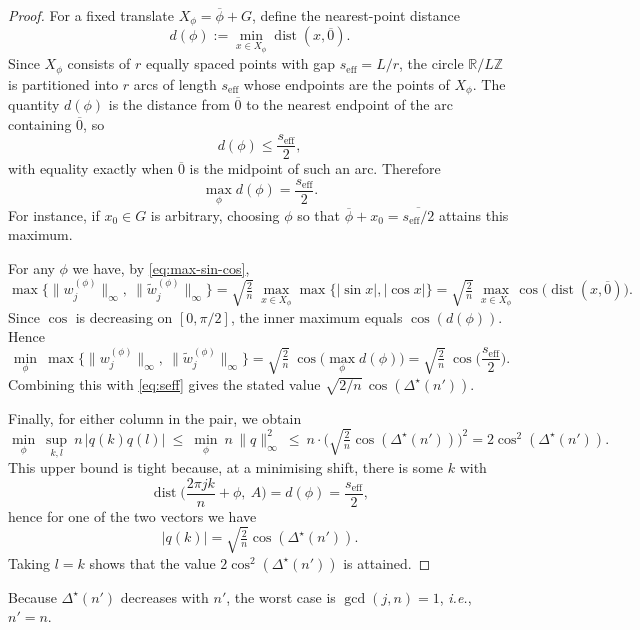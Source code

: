 \documentclass[12pt,fleqn]{amsart}
\renewcommand{\le}{\leqslant}
\theoremstyle{remark}
\newcommand{\1}{\mathbf{1}}
\begin{document}
\begin{proof}
For a fixed translate $X_\phi=\overline{\phi}+G$, define the nearest-point distance
\[
d(\phi):=\min_{x\in X_\phi}\operatorname{dist}(x,\overline{0}).
\]
Since $X_\phi$ consists of $r$ equally spaced points with gap $s_{\mathrm{eff}}=L/r$, the circle $\mathbb R/L\mathbb Z$ is partitioned into $r$ arcs of length $s_{\mathrm{eff}}$ whose endpoints are the points of $X_\phi$. The quantity $d(\phi)$ is the distance from $\overline{0}$ to the nearest endpoint of the arc containing $\overline{0}$, so
\[
d(\phi)\le \frac{s_{\mathrm{eff}}}{2},
\]
with equality exactly when $\overline{0}$ is the midpoint of such an arc. Therefore
\[
\max_{\phi} d(\phi)=\frac{s_{\mathrm{eff}}}{2}.
\]
For instance, if $x_0\in G$ is arbitrary, choosing $\phi$ so that $\overline{\phi}+x_0=\overline{s_{\mathrm{eff}}/2}$ attains this maximum.

\smallskip

For any $\phi$ we have, by \eqref{eq:max-sin-cos},
\[
\max\Big\{\|w^{(\phi)}_j\|_\infty,\ \|\tilde w^{(\phi)}_j\|_\infty\Big\}
=\sqrt{\tfrac{2}{n}}\ \max_{x\in X_\phi}\max\{|\sin x|,|\cos x|\}
=\sqrt{\tfrac{2}{n}}\ \max_{x\in X_\phi}\cos\big(\operatorname{dist}(x,\overline{0})\big).
\]
Since $\cos$ is decreasing on $[0,\pi/2]$, the inner maximum equals $\cos(d(\phi))$. Hence
\[
\min_{\phi}\ \max\Big\{\|w^{(\phi)}_j\|_\infty,\ \|\tilde w^{(\phi)}_j\|_\infty\Big\}
=\sqrt{\tfrac{2}{n}}\ \cos\!\Big(\max_{\phi} d(\phi)\Big)
=\sqrt{\tfrac{2}{n}}\ \cos\!\Big(\frac{s_{\mathrm{eff}}}{2}\Big).
\]
Combining this with \eqref{eq:seff} gives the stated value $\sqrt{2/n}\,\cos(\Delta^\star(n'))$.

Finally, for either column in the pair, we obtain
\[
\min_{\phi}\ \sup_{k,l}\ n\,|q(k)q(l)|
\ \le\ \min_{\phi}\ n\,\|q\|_\infty^2
\ \le\ n\cdot \Big(\sqrt{\tfrac{2}{n}}\cos(\Delta^\star(n'))\Big)^2
=2\cos^2(\Delta^\star(n')).
\]
This upper bound is tight because, at a minimising shift, there is some $k$ with
\[
\operatorname{dist}\!\Big(\frac{2\pi jk}{n}+\phi,\ A\Big)=d(\phi)=\frac{s_{\mathrm{eff}}}{2},
\]
hence for one of the two vectors we have
\[
|q(k)|=\sqrt{\tfrac{2}{n}}\cos(\Delta^\star(n')).
\]
Taking $l=k$ shows that the value $2\cos^2(\Delta^\star(n'))$ is attained.
\end{proof}


Because $\Delta^\star(n')$ decreases with $n'$, the worst case is $\gcd(j,n)=1$, \emph{i.e.},\ $n'=n$.
\end{document}
